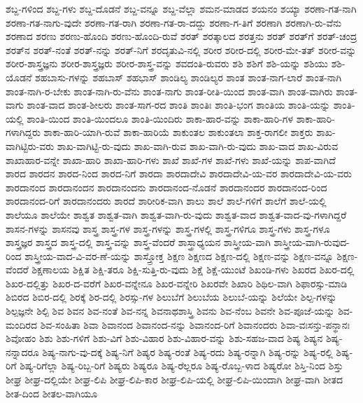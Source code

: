 {ಶಬ್ದ-ಗಳಿಂದ
ಶಬ್ದ-ಗಳು
ಶಬ್ದ-ದೊಡನೆ
ಶಬ್ದ-ವನ್ನೂ
ಶಬ್ದ-ವೆಲ್ಲಾ
ಶಮನ-ಮಾಡದ
ಶಯನಂ
ಶಯ್ಯಾ
ಶರಣಾ-ಗತ-ನಾಗಿ
ಶರಣಾ-ಗತ-ನಾಗು-ವುದೇ
ಶರಣಾ-ಗತ-ರಾಗಿ
ಶರಣಾ-ಗತ-ರಾ-ದದ್ದು
ಶರಣಾ-ಗ-ತಿಗೆ
ಶರಣಾಗಿ
ಶರಣಾಗಿ-ರು-ವೆನು
ಶರಣಾದ
ಶರಣು
ಶರಣು-ಹೊಂದಿ
ಶರಣು-ಹೊಂದಿ-ರುವೆ
ಶರತ್
ಶರತ್ಕಾಲದ
ಶರತ್ತನು
ಶರತ್‌
ಶರತ್‌ಗೆ
ಶರತ್‌-ಚಂದ್ರ
ಶರತ್‌ನ
ಶರತ್‌-ನಂತೆ
ಶರತ್‌-ನನ್ನು
ಶರತ್‌-ನಿಗೆ
ಶರದೃತುವಿ-ನಲ್ಲಿ
ಶರೀರ
ಶರೀರ-ದಲ್ಲಿ
ಶರೀರ-ಮೇ-ತತ್
ಶರೀರ-ವನ್ನು
ಶರೀರ-ಶಾಸ್ತ್ರಜ್ಞನು
ಶರೀರ-ಶಾಸ್ತ್ರಜ್ಞರು
ಶರೀರ-ಶಾಸ್ತ್ರ-ವನ್ನು
ಶವದಂತಿ-ರುವರು
ಶಶಿ
ಶಶಿಗೆ
ಶಶಿ-ಯನ್ನು
ಶಶಿಯು
ಶಶಿ-ಯೊಡನೆ
ಶಹಬಾಸು-ಗಳನ್ನು
ಶಹಬಾಸ್
ಶಹಭಾಸ್
ಶಾಂಡಿಲ್ಯ
ಶಾಂಡಿಲ್ಯರ
ಶಾಂತ
ಶಾಂತ-ನಾಗ-ಲಾರೆ
ಶಾಂತ-ನಾಗಿ
ಶಾಂತ-ನಾಗಿ-ರ-ಬೇಕು
ಶಾಂತ-ನಾಗಿ-ರು-ವೆನು
ಶಾಂತ-ನಾಗು
ಶಾಂತ-ರೀತಿ-ಯಿಂದ
ಶಾಂತ-ವಾಗಿ
ಶಾಂತ-ವಾಗಿರು
ಶಾಂತ-ವಾಗು
ಶಾಂತ-ವಾದ
ಶಾಂತ-ಶೀಲರು
ಶಾಂತ-ಸಾಗ-ರದ
ಶಾಂತಿ
ಶಾಂತಿಃ
ಶಾಂತಿ-ಭಂಗ
ಶಾಂತಿಯ
ಶಾಂತಿ-ಯನ್ನು
ಶಾಂತಿ-ಯಲ್ಲಿ
ಶಾಂತಿ-ಯಿಂದ
ಶಾಂತಿ-ಯಿಂದಲೂ
ಶಾಂತಿ-ಯಿಂದಿರು
ಶಾಕಾ-ಹಾರ-ವನ್ನು
ಶಾಕಾ-ಹಾರಿ-ಗಳ
ಶಾಕಾ-ಹಾರಿ-ಗಳಾಗಿದ್ದರು
ಶಾಕಾ-ಹಾರಿ-ಯಾಗಿ-ರುವೆ
ಶಾಕಾ-ಹಾರಿಯೆ
ಶಾಕುಂತಲ
ಶಾಕುಂತಲಾ
ಶಾಕ್ತ-ರಾಗಲೀ
ಶಾಕ್ತರು
ಶಾಖ-ವಾಗಿಟ್ಟಿರು-ವರು
ಶಾಖ-ವಾಗಿಟ್ಟಿ-ರು-ವುದು
ಶಾಖ-ವಾಗಿ-ರುವ
ಶಾಖ-ವಾಗಿ-ರು-ವುದು
ಶಾಖ-ವಾದ
ಶಾಖ-ವಿರುವ
ಶಾಖಾಹಾರ-ವನ್ನೇ
ಶಾಖಾ-ಹಾರಿ
ಶಾಖಾ-ಹಾರಿ-ಗಳು
ಶಾಖೆ
ಶಾಖೆ-ಗಳ
ಶಾಖೆ-ಗಳು
ಶಾಖೆ-ಯನ್ನು
ಶಾಪ-ವಾಗಿದೆ
ಶಾರದ
ಶಾರದನ
ಶಾರದ-ನಿಂದ
ಶಾರದ-ನಿಗೆ
ಶಾರದಾ
ಶಾರದಾದೇವಿ
ಶಾರದಾದೇವಿ-ಯ-ವರ
ಶಾರದಾದೇವಿ-ಯ-ವರು
ಶಾರದಾನಂದ
ಶಾರದಾನಂದನ
ಶಾರದಾನಂದನು
ಶಾರದಾನಂದ-ನೊಡನೆ
ಶಾರದಾನಂದರ
ಶಾರದಾನಂದ-ರಿಂದ
ಶಾರದಾನಂದ-ರಿಗೆ
ಶಾರದಾನಂದರು
ಶಾರದೆ
ಶಾರೀರಿಕ-ವಾಗಿ
ಶಾಲು
ಶಾಲೆ
ಶಾಲೆ-ಗಳಿಗೆ
ಶಾಲೆಗೆ
ಶಾಲೆ-ಯಲ್ಲಿ
ಶಾಲೆಯೂ
ಶಾಲೆಯೇ
ಶಾಶ್ವತ
ಶಾಶ್ವತ-ವಾಗಿ
ಶಾಶ್ವತ-ವಾಗಿ-ರು-ವುದು
ಶಾಶ್ವತ-ವಾದ
ಶಾಶ್ವತ-ವಾದ-ವು-ಗಳಾಗಿದ್ದರೆ
ಶಾಸನ-ಗಳನ್ನು
ಶಾಸನವು
ಶಾಸ್ತ್ರ
ಶಾಸ್ತ್ರ-ಗಳ
ಶಾಸ್ತ್ರ-ಗಳನ್ನು
ಶಾಸ್ತ್ರ-ಗಳಲ್ಲಿ
ಶಾಸ್ತ್ರ-ಗಳಿಗೂ
ಶಾಸ್ತ್ರ-ಗಳು
ಶಾಸ್ತ್ರ-ಗಳೂ
ಶಾಸ್ತ್ರಜ್ಞರ
ಶಾಸ್ತ್ರದ
ಶಾಸ್ತ್ರ-ದಲ್ಲಿ
ಶಾಸ್ತ್ರ-ವನ್ನು
ಶಾಸ್ತ್ರ-ವೆಂದರೆ
ಶಾಸ್ತ್ರಾಧ್ಯಯನ
ಶಾಸ್ತ್ರೀಯ-ವಾಗಿ
ಶಾಸ್ತ್ರೀಯ-ವಾಗಿ-ರುವುದ-ರಿಂದ
ಶಾಸ್ತ್ರೀಯ-ವಾದ-ವಿ-ವರ-ಣೆ-ಯನ್ನು
ಶಾಸ್ತ್ರೋಕ್ತ
ಶಿಕ್ಷಣ
ಶಿಕ್ಷಣದ
ಶಿಕ್ಷಣ-ದಲ್ಲಿ
ಶಿಕ್ಷಣ-ವನ್ನು
ಶಿಕ್ಷಣ-ವನ್ನೂ
ಶಿಕ್ಷಣ-ವೆಂದರೆ
ಶಿಕ್ಷಣಾಲಯ
ಶಿಕ್ಷಿತ
ಶಿಕ್ಷಿ-ತರೂ
ಶಿಕ್ಷಿ-ಸುತ್ತಿ-ರು-ವುದು
ಶಿಕ್ಷೆ
ಶಿಕ್ಷೆ-ಯುಂಟೆ
ಶಿಖಂಡಿ-ಗಳು
ಶಿಖರದ
ಶಿಖರ-ದಲ್ಲಿ
ಶಿಖರ-ದಲ್ಲಿತ್ತು
ಶಿಖರ-ದ-ವರೆಗೆ
ಶಿಖರ-ವನ್ನೇನೂ
ಶಿಖರ-ವನ್ನೇರಿ
ಶಿಖರವೇ
ಶಿಖಾರಿ
ಶಿಥಿಲ-ವಾಗಿ
ಶಿಫಾರಸ್ಸು-ಮಾಡಿ
ಶಿಬಿರದ
ಶಿಬಿರ-ದಲ್ಲಿ
ಶಿರಕ್ಕೆ
ಶಿರ-ದಲ್ಲಿ
ಶಿರಸ್ಸು-ಗಳ
ಶಿಲುಬೆಗೆ
ಶಿಲುಬೆಯ
ಶಿಲುಬೆ-ಯನ್ನು
ಶಿಲೆಯೇ
ಶಿಲ್ಪ-ಗಳನ್ನು
ಶಿಲ್ಪಜ್ಞನೇ
ಶಿಲ್ಪಿ
ಶಿವ
ಶಿವನ
ಶಿವ-ನಂತೆ
ಶಿವ-ನನ್ನ
ಶಿವನಾಥಶಾಸ್ತ್ರಿ
ಶಿವನು
ಶಿವ-ನೆಂಬ
ಶಿವನೇ
ಶಿವ-ಪೂಜೆ-ಯನ್ನು
ಶಿವ-ಮಂದಿರದ
ಶಿವ-ಸಂಹಿತಾ
ಶಿವಾ
ಶಿವಾನಂದ
ಶಿವಾನಂದ-ನನ್ನು
ಶಿವಾನಂದ-ರಿಗೆ
ಶಿವಾನಂದರು
ಶಿವಾ-ವಃಸನ್ತು-ಪನ್ಥಾನಃ
ಶಿವೋಹಂ
ಶಿಶು
ಶಿಶು-ಗಳಿಗೆ
ಶಿಶು-ವಿಗೆ
ಶಿಶು-ವಿಹಾರ
ಶಿಶು-ವಿಹಾರ-ವನ್ನು
ಶಿಶು-ಸಹಜ-ವಾದ
ಶಿಷ್ಯ
ಶಿಷ್ಯನ
ಶಿಷ್ಯ-ನನ್ನಾದರೂ
ಶಿಷ್ಯ-ನಾಗು-ವು-ದಕ್ಕೆ
ಶಿಷ್ಯ-ನಿಗೆ
ಶಿಷ್ಯರ
ಶಿಷ್ಯ-ರಂತೆ
ಶಿಷ್ಯ-ರದು
ಶಿಷ್ಯ-ರನ್ನಾಗಿ
ಶಿಷ್ಯ-ರನ್ನು
ಶಿಷ್ಯ-ರಲ್ಲಿ
ಶಿಷ್ಯ-ರಿಗೆ
ಶಿಷ್ಯ-ರಿಗೆಲ್ಲಾ
ಶಿಷ್ಯ-ರಿಬ್ಬ-ರಿಗೆ
ಶಿಷ್ಯರು
ಶಿಷ್ಯರೂ
ಶಿಷ್ಯ-ರೆಲ್ಲರೂ
ಶಿಷ್ಯ-ರೊಬ್ಬ-ಳಾದ
ಶಿಷ್ಯರೋ
ಶಿಸ್ತಿ-ನಿಂದ
ಶಿಸ್ತು
ಶೀಘ್ರ
ಶೀಘ್ರ-ದಲ್ಲಿಯೇ
ಶೀಘ್ರ-ಲಿಪಿ
ಶೀಘ್ರ-ಲಿಪಿ-ಕಾರ
ಶೀಘ್ರ-ಲಿಪಿ-ಯಲ್ಲಿ
ಶೀಘ್ರ-ಲಿಪಿ-ಯಿಂದಾಗಿ
ಶೀಘ್ರ-ವಾಗಿ
ಶೀತದ
ಶೀತ-ದಿಂದ
ಶೀತಲ-ವಾಗಿಯೂ
}
